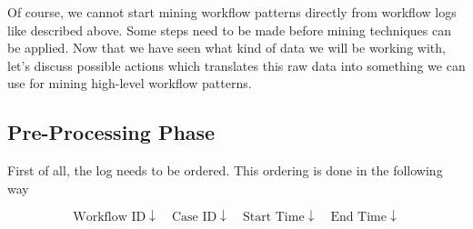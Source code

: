 \documentclass[a4paper,11pt]{article}
\begin{document}
\begin{table}[H]
\centering
\caption{Sequences of workflow with ID 1, based on the workflow log in Table \ref{table:log}.}
\label{table:example_sequences}
\end{table}

Of course, we cannot start mining workflow patterns directly from workflow logs like described above. Some steps need to be made before mining techniques can be applied. Now that we have seen what kind of data we will be working with, let's discuss possible actions which translates this raw data into something we can use for mining high-level workflow patterns.

\subsection{Pre-Processing Phase}
First of all, the log needs to be ordered. This ordering is done in the following way

\begin{equation}
\text{Workflow ID} \downarrow \quad \text{Case ID} \downarrow \quad \text{Start Time} \downarrow \quad \text{End Time} \downarrow
\end{equation}
\end{document}
